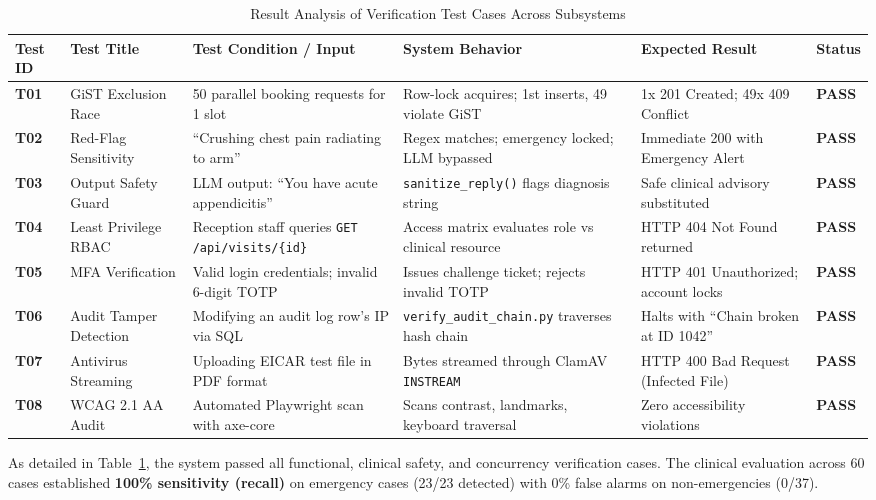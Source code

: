 \documentclass[conference]{IEEEtran}
\begin{document}
\begin{table}[!t]
\caption{Result Analysis of Verification Test Cases Across Subsystems}
\label{tab:testcases}
\centering
\begin{tabular}{@{}llllll@{}}
\toprule
\textbf{Test ID} & \textbf{Test Title} & \textbf{Test Condition / Input} & \textbf{System Behavior} & \textbf{Expected Result} & \textbf{Status} \\
\midrule
\textbf{T01} & GiST Exclusion Race & 50 parallel booking requests for 1 slot & Row-lock acquires; 1st inserts, 49 violate GiST & 1x 201 Created; 49x 409 Conflict & \textbf{PASS} \\
\textbf{T02} & Red-Flag Sensitivity & ``Crushing chest pain radiating to arm'' & Regex matches; emergency locked; LLM bypassed & Immediate 200 with Emergency Alert & \textbf{PASS} \\
\textbf{T03} & Output Safety Guard & LLM output: ``You have acute appendicitis'' & \texttt{sanitize\_reply()} flags diagnosis string & Safe clinical advisory substituted & \textbf{PASS} \\
\textbf{T04} & Least Privilege RBAC & Reception staff queries \texttt{GET /api/visits/\{id\}} & Access matrix evaluates role vs clinical resource & HTTP 404 Not Found returned & \textbf{PASS} \\
\textbf{T05} & MFA Verification & Valid login credentials; invalid 6-digit TOTP & Issues challenge ticket; rejects invalid TOTP & HTTP 401 Unauthorized; account locks & \textbf{PASS} \\
\textbf{T06} & Audit Tamper Detection & Modifying an audit log row's IP via SQL & \texttt{verify\_audit\_chain.py} traverses hash chain & Halts with ``Chain broken at ID 1042'' & \textbf{PASS} \\
\textbf{T07} & Antivirus Streaming & Uploading EICAR test file in PDF format & Bytes streamed through ClamAV \texttt{INSTREAM} & HTTP 400 Bad Request (Infected File) & \textbf{PASS} \\
\textbf{T08} & WCAG 2.1 AA Audit & Automated Playwright scan with axe-core & Scans contrast, landmarks, keyboard traversal & Zero accessibility violations & \textbf{PASS} \\
\bottomrule
\end{tabular}
\end{table}

As detailed in Table~\ref{tab:testcases}, the system passed all functional, clinical safety, and concurrency verification cases. The clinical evaluation across 60 cases established \textbf{100\% sensitivity (recall)} on emergency cases (23/23 detected) with 0\% false alarms on non-emergencies (0/37).
\end{document}
